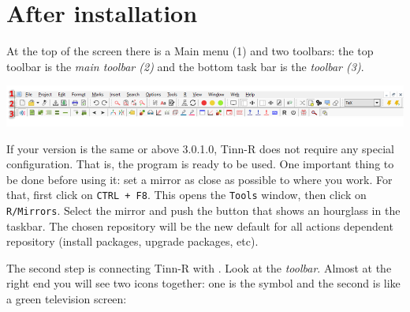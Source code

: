 
\hypertarget{secrets_after_installation}{}
\section{After installation}

At the top of the screen there is a Main menu (1) and two toolbars: the top toolbar is the \textit{main toolbar (2)}
and the bottom task bar is the \textit{\RR{} toolbar (3)}.

\vspace{5mm}
\includegraphics[width=\headwidth]{./res/parts_02.png}
\vspace{5mm}

%


If your version is the same or above 3.0.1.0, Tinn-R does not require any special configuration.
That is, the program is ready to be used. One important thing to be done before using it:
set a \RR{} mirror as close as possible to where you work. For that, first click on \texttt{CTRL + F8}.
This opens the \texttt{Tools} window, then click on \texttt{R/Mirrors}.
Select the \RR{} mirror and push the button that shows an hourglass in the taskbar.
The chosen repository will be the new default for all actions dependent repository
(install packages, upgrade packages, etc).

The second step is connecting Tinn-R with \RR{}. Look at the \textit{\RR{} toolbar}.
Almost at the right end you will see two icons together: one is the \RR{} symbol and the second is like a green television screen:

